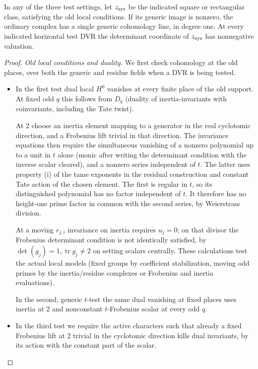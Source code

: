 \begin{lemma}\label{lem:positive-determinant:horizontal}
In any of the three test settings, let \(z_{\rm sys}\) be the indicated
square or rectangular class, satisfying the old local conditions. If its
generic image is nonzero, the ordinary complex has a single generic
cohomology line, in degree one. At every indicated horizontal test DVR the
determinant coordinate of \(z_{\rm sys}\) has nonnegative valuation.
\end{lemma}
\begin{proof}
\emph{Old local conditions and duality.}
We first check cohomology at the old places, over both the generic and
residue fields when a DVR is being tested.
\begin{itemize}
\item In the first test dual local \(H^0\) vanishes at every finite place of the old support. At fixed odd \(q\) this follows from \(D_q\) (duality of inertia-invariants with coinvariants, including the Tate twist). 

At 2 choose an inertia element mapping to a generator in the real cyclotomic direction, and a Frobenius lift trivial in that direction. The invariance equations then require the simultaneous vanishing of a nonzero polynomial up to a unit in \(t\) alone (monic after writing the determinant condition with the inverse scalar cleared), and a nonzero series independent of \(t\). The latter uses property (i) of the tame exponents in the residual construction and constant Tate action of the chosen element. The first is regular in \(t\), so its distinguished polynomial has no factor independent of \(t\). It therefore has no height-one prime factor in common with the second series, by Weierstrass division. 

At a moving \(r_{j,i}\) invariance on inertia requires \(u_j=0\); on that divisor the Frobenius determinant condition is not identically satisfied, by \(\det(g_j)=1,\operatorname{tr}g_j\ne2\) on setting scalars centrally. These calculations test the actual local models (fixed groups by coefficient stabilization, moving odd primes by the inertia/residue complexes or Frobenius and inertia evaluations). 

In the second, generic \(t\)-test the same dual vanishing at fixed places uses inertia at 2 and nonconstant \(t\)-Frobenius scalar at every odd \(q\).
\item In the third test we require the active characters such that already a fixed Frobenius lift at 2 trivial in the cyclotomic direction kills dual invariants, by its action with the constant part of the scalar. 


\end{itemize}
\end{proof}
